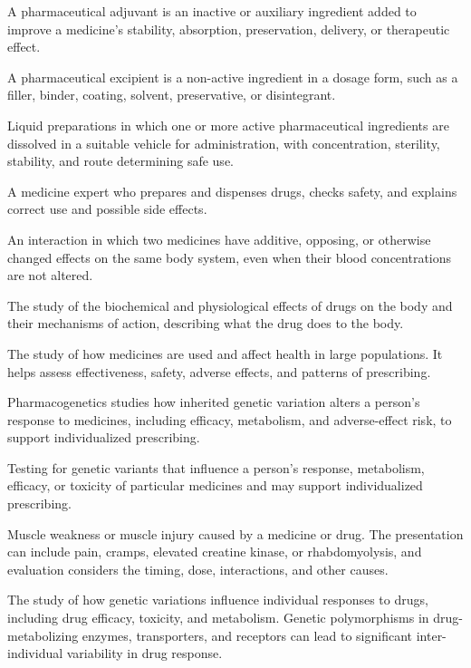  A pharmaceutical adjuvant is an inactive or auxiliary ingredient added to improve a medicine’s stability, absorption, preservation, delivery, or therapeutic effect.

 A pharmaceutical excipient is a non-active ingredient in a dosage form, such as a filler, binder, coating, solvent, preservative, or disintegrant.

 Liquid preparations in which one or more active pharmaceutical ingredients are dissolved in a suitable vehicle for administration, with concentration, sterility, stability, and route determining safe use.

 A medicine expert who prepares and dispenses drugs, checks safety, and explains correct use and possible side effects.

 An interaction in which two medicines have additive, opposing, or otherwise changed effects on the same body system, even when their blood concentrations are not altered.

 The study of the biochemical and physiological effects of drugs on the body and their mechanisms of action, describing what the drug does to the body.

 The study of how medicines are used and affect health in large populations. It helps assess effectiveness, safety, adverse effects, and patterns of prescribing.

 Pharmacogenetics studies how inherited genetic variation alters a person's response to medicines, including efficacy, metabolism, and adverse-effect risk, to support individualized prescribing.

 Testing for genetic variants that influence a person’s response, metabolism, efficacy, or toxicity of particular medicines and may support individualized prescribing.

 Muscle weakness or muscle injury caused by a medicine or drug. The presentation can include pain, cramps, elevated creatine kinase, or rhabdomyolysis, and evaluation considers the timing, dose, interactions, and other causes.

 The study of how genetic variations influence individual responses to drugs, including
drug efficacy, toxicity, and metabolism. Genetic polymorphisms in drug-metabolizing
enzymes, transporters, and receptors can lead to significant inter-individual
variability in drug response.

